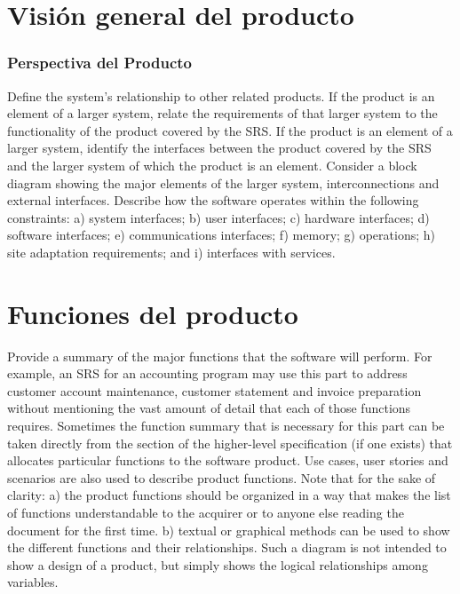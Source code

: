\documentclass[12pt, a4paper, twoside]{article}
\begin{document}

\section{Visión general del producto}
\subsubsection{Perspectiva del Producto}
 Define the system's relationship to other related products.
 If the product is an element of a larger system, relate the requirements of that larger system to the
 functionality of the product covered by the SRS.
 If the product is an element of a larger system, identify the interfaces between the product covered by
 the SRS and the larger system of which the product is an element.
 Consider a block diagram showing the major elements of the larger system, interconnections and
 external interfaces.
 Describe how the software operates within the following constraints:
 a) system interfaces;
 b) user interfaces;
 c) hardware interfaces;
 d) software interfaces;
 e) communications interfaces;
 f) memory;
 g) operations;
 h) site adaptation requirements; and
 i) interfaces with services.

 \section{Funciones del producto}
 Provide a summary of the major functions that the software will perform. For example, an SRS for an
 accounting program may use this part to address customer account maintenance, customer statement
 and invoice preparation without mentioning the vast amount of detail that each of those functions
 requires.
 Sometimes the function summary that is necessary for this part can be taken directly from the section
 of the higher-level specification (if one exists) that allocates particular functions to the software
 product.
 Use cases, user stories and scenarios are also used to describe product functions.
 Note that for the sake of clarity:
 a) the product functions should be organized in a way that makes the list of functions understandable
 to the acquirer or to anyone else reading the document for the first time.
 b) textual or graphical methods can be used to show the different functions and their relationships.
 Such a diagram is not intended to show a design of a product, but simply shows the logical
 relationships among variables.
\end{document}
